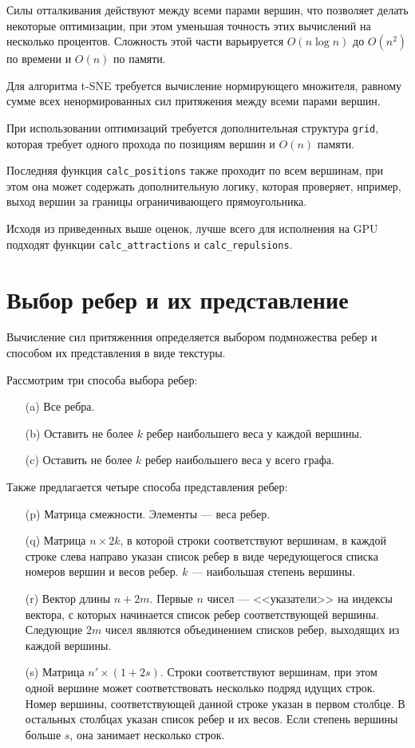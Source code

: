 Силы отталкивания действуют между всеми парами вершин, что позволяет делать некоторые оптимизации, при этом уменьшая точность этих вычислений на несколько процентов. Сложность этой части варьируется $O(n\log n)$ до $O(n^2)$ по времени и $O(n)$ по памяти.

Для алгоритма t-SNE требуется вычисление нормирующего множителя, равному сумме всех ненормированных сил притяжения между всеми парами вершин. 

При использовании оптимизаций требуется дополнительная структура \texttt{grid}, которая требует одного прохода по позициям вершин и $O(n)$ памяти.

Последняя функция \texttt{calc\_positions} также проходит по всем вершинам, при этом она может содержать дополнительную логику, которая проверяет, нпример, выход вершин за границы ограничивающего прямоугольника.

Исходя из приведенных выше оценок, лучше всего для исполнения на GPU подходят функции \texttt{calc\_attractions} и \texttt{calc\_repulsions}.

\section{Выбор ребер и их представление}

Вычисление сил притяженния определяется выбором подмножества ребер и способом их представления в виде текстуры.

Рассмотрим три способа выбора ребер:
\begin{itemize}
\item[(a)] Все ребра.
\item[(b)] Оставить не более $k$ ребер наибольшего веса у каждой вершины.
\item[(c)] Оставить не более $k$ ребер наибольшего веса у всего графа.
\end{itemize}

Также предлагается четыре способа представления ребер:
\begin{itemize}
\item[(p)] Матрица смежности. Элементы --- веса ребер.
\item[(q)] Матрица $n\times 2k$, в которой строки соответствуют вершинам, в каждой строке слева направо указан список ребер в виде чередующегося списка номеров вершин и весов ребер. $k$ --- наибольшая степень вершины.
\item[(r)] Вектор длины $n + 2m$. Первые $n$ чисел --- <<указатели>> на индексы вектора, с которых начинается список ребер соответствующей вершины. Следующие $2m$ чисел являются объединением списков ребер, выходящих из каждой вершины.
\item[(s)] Матрица $n'\times (1 + 2s)$. Строки соответствуют вершинам, при этом одной вершине может соответствовать несколько подряд идущих строк. Номер вершины, соответствующей данной строке указан в первом столбце. В остальных столбцах указан список ребер и их весов. Если степень вершины больше $s$, она занимает несколько строк.
\end{itemize}


